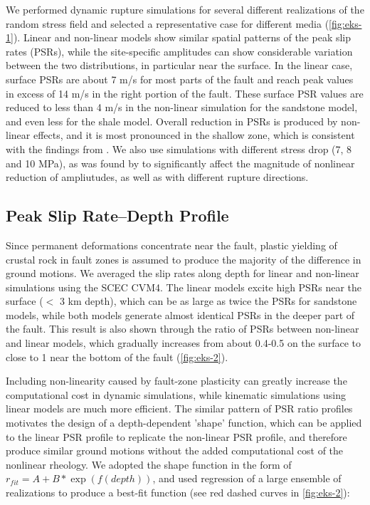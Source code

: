 We performed dynamic rupture simulations for several different realizations of the random stress field and selected a representative case for different media (\cref{fig:eks-1}). Linear and non-linear models show similar spatial patterns of the peak slip rates (PSRs), while the site-specific amplitudes can show considerable variation between the two distributions, in particular near the surface. In the linear case, surface PSRs are about 7 m/s for most parts of the fault and reach peak values in excess of 14 m/s in the right portion of the fault. These surface PSR values are reduced to less than 4 m/s in the non-linear simulation for the sandstone model, and even less for the shale model. Overall reduction in PSRs is produced by non-linear effects, and it is most pronounced in the shallow zone, which is consistent with the findings from \citet{rotenExpectedSeismicShaking2014}. We also use simulations with different stress drop (7, 8 and 10 MPa), as was found by \citet{rotenOfffaultDeformationsShallow2017} to significantly affect the magnitude of nonlinear reduction of ampliutudes, as well as with different rupture directions.

\subsection{Peak Slip Rate–Depth Profile}\label{eks:methods}
Since permanent deformations concentrate near the fault, plastic yielding of crustal rock in fault zones is assumed to produce the majority of the difference in ground motions. We averaged the slip rates along depth for linear and non-linear simulations using the SCEC CVM4. The linear models excite high PSRs near the surface ($<$ 3 km depth), which can be as large as twice the PSRs for sandstone models, while both models generate almost identical PSRs in the deeper part of the fault. This result is also shown through the ratio of PSRs between non-linear and linear models, which gradually increases from about 0.4-0.5 on the surface to close to 1 near the bottom of the fault (\cref{fig:eks-2}).

Including non-linearity caused by fault-zone plasticity can greatly increase the computational cost in dynamic simulations, while kinematic simulations using linear models are much more efficient. The similar pattern of PSR ratio profiles motivates the design of a depth-dependent 'shape' function, which can be applied to the linear PSR profile to replicate the non-linear PSR profile, and therefore produce similar ground motions without the added computational cost of the nonlinear rheology. We adopted the shape function in the form of $r_{fit}=A+B * \exp \left(f(depth)\right)$, and used regression of a large ensemble of realizations to produce a best-fit function (see red dashed curves in \cref{fig:eks-2}):

